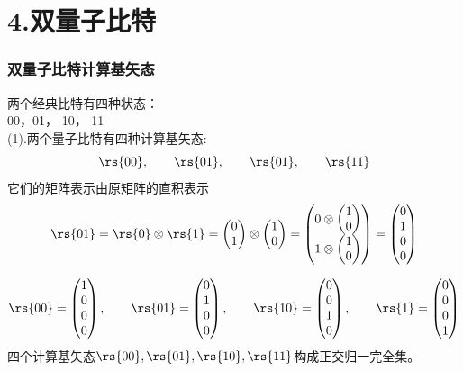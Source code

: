 \section{4.双量子比特}


\begin{frame} 
\frametitle{双量子比特计算基矢态}
两个经典比特有四种状态：\\
00，01， 10， 11\\
(1).两个量子比特有四种计算基矢态:
\[\rs{00}, \qquad \rs{01}, \qquad \rs{01}, \qquad \rs{11} \] 
它们的矩阵表示由原矩阵的直积表示 
\[\rs{01} = \rs{0} \otimes \rs{1} =    
\begin{pmatrix}
    0\\
    1
\end{pmatrix}
\otimes
\begin{pmatrix}
    1\\
    0
\end{pmatrix}
=
\begin{pmatrix}
    0 \otimes \begin{pmatrix}
        1\\
        0
    \end{pmatrix}\\
    1 \otimes \begin{pmatrix}
        1\\
        0
    \end{pmatrix}
\end{pmatrix}
=
\begin{pmatrix}
    0\\
    1\\
    0\\
    0
\end{pmatrix}
 \] 

\end{frame}

\begin{frame} 
\[
\rs{00} = 
\begin{pmatrix}
    1\\
    0\\
    0\\
    0
\end{pmatrix},\qquad
\rs{01} = 
\begin{pmatrix}
    0\\
    1\\
    0\\
    0
\end{pmatrix},\qquad
\rs{10} = 
\begin{pmatrix}
    0\\
    0\\
    1\\
    0
\end{pmatrix},\qquad
\rs{1} = 
\begin{pmatrix}
    0\\
    0\\
    0\\
    1
\end{pmatrix}
\] \vspace{0.6em}
\Note 四个计算基矢态$ \rs{00}, \rs{01},\rs{10},\rs{11} $构成正交归一完全集。
\end{frame}

